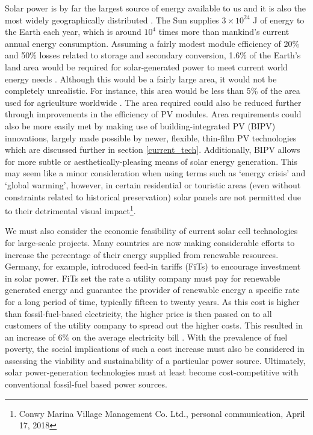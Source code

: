 \documentclass[11pt, twoside]{report}
\begin{document}
Solar power is by far the largest source of energy available to us and it is also the most widely geographically distributed \cite{inorg_pv}. The Sun supplies $3 \times 10^{24}$ J of energy to the Earth each year, which is around $10^4$ times more than mankind's current annual energy consumption. 
Assuming a fairly modest module efficiency of 20\% and 50\% losses related to storage and secondary conversion, 1.6\% of the Earth’s land area would be required for solar-generated power to meet current world energy needs \cite{newPVrev}. Although this would be a fairly large area, it would not be completely unrealistic. For instance, this area would be less than 5\% of the area used for agriculture worldwide \cite{newPVrev}. The area required could also be reduced further through improvements in the efficiency of PV modules. Area requirements could also be more easily met by making use of building-integrated PV (BIPV) innovations, largely made possible by newer, flexible, thin-film PV technologies which are discussed further in section \ref{current_tech}.
Additionally, BIPV allows for more subtle or aesthetically-pleasing means of solar energy generation. This may seem like a minor consideration when using terms such as `energy crisis' and `global warming', however, in certain residential or touristic areas (even without constraints related to historical preservation) solar panels are not permitted due to their detrimental visual impact\footnote{Conwy Marina Village Management Co. Ltd., personal communication, April 17, 2018}.

We must also consider the economic feasibility of current solar cell technologies for large-scale projects.
Many countries are now making considerable efforts to increase the percentage of their energy supplied from renewable resources. Germany, for example, introduced feed-in tariffs (FiTs) to encourage investment in solar power.
FiTs set the rate a utility company must pay for renewable generated energy and guarantee the provider of renewable energy a specific rate for a long period of time, typically fifteen to twenty years. As this cost is higher than fossil-fuel-based electricity, the higher price is then passed on to all customers of the utility company to spread out the higher costs. This resulted in an increase of 6\% on the average electricity bill \cite{Germany_Oregon}. With the prevalence of fuel poverty, the social implications of such a cost increase must also be considered in assessing the viability and sustainability of a particular power source.
Ultimately, solar power-generation technologies must at least become cost-competitive with conventional fossil-fuel based power sources.
\end{document}
